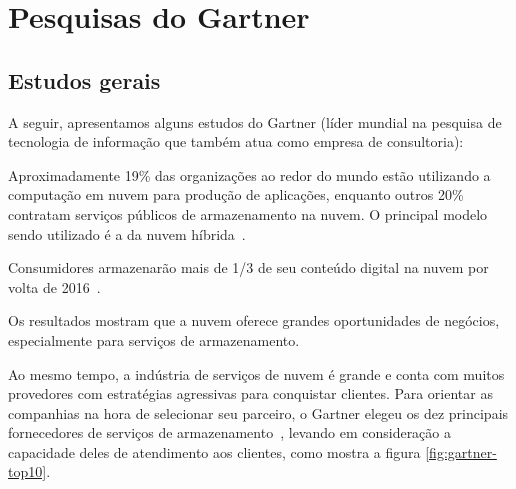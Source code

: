 \section{Pesquisas do Gartner}


\subsection{Estudos gerais}

A seguir, apresentamos alguns estudos do Gartner (líder mundial na
pesquisa de tecnologia de informação que também atua como empresa de consultoria):

\begin{itemise}

    \item Aproximadamente 19\% das organizações ao redor do mundo estão utilizando a
    computação em nuvem para produção de aplicações, enquanto outros 20\% contratam
    serviços públicos de armazenamento na nuvem. O principal modelo sendo utilizado é
    a da nuvem híbrida~\cite{gartner-public-cloud-services}.

    \item Consumidores armazenarão mais de 1/3 de seu conteúdo digital na nuvem por
    volta de 2016~\cite{gartner-one-third}.


\end{itemise}

Os resultados mostram que a nuvem oferece grandes oportunidades de negócios,
especialmente para serviços de armazenamento. 

Ao mesmo tempo, a indústria de serviços de nuvem é grande e conta com muitos 
provedores com estratégias agressivas para conquistar clientes. Para orientar as 
companhias na hora de selecionar seu parceiro, o Gartner elegeu os dez principais 
fornecedores de serviços de armazenamento~\cite{gartner-top-10}, levando em 
consideração a capacidade deles de atendimento aos clientes, como mostra a figura 
\ref{fig:gartner-top10}.

